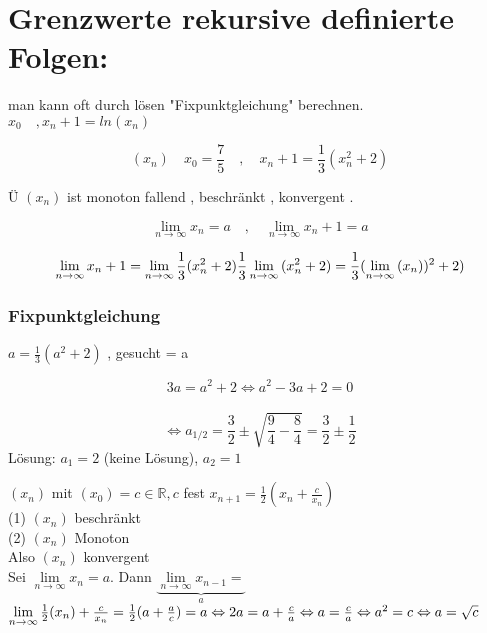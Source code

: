 \newpage

\section{Grenzwerte rekursive definierte Folgen:}

man kann oft durch lösen "Fixpunktgleichung" berechnen.\\
$x_0 \quad , x_n+1 = ln(x_n)$

\begin{example}
\[(x_n) \quad x_0 = \frac{7}{5} \quad,\quad x_n+1= \frac{1}{3}(x_n^2+2)  \]

Ü $(x_n)$ ist monoton fallend , beschränkt , konvergent . 

\[\lim\limits_{n \rightarrow \infty}{x_n}=a \quad,\quad 
\lim\limits_{n \rightarrow \infty}{x_n+1}=a \]

\begin{equation*}
\begin{aligned}
\lim\limits_{n \rightarrow \infty}{x_n+1} 
= \linebreak  
\lim\limits_{n \rightarrow \infty}{\frac{1}{3}(x_n^2 + 2)
\frac{1}{3}} \lim\limits_{n \rightarrow \infty}{(x_n^2 + 2)}
=
\frac{1}{3} (\lim\limits_{n \rightarrow \infty}{(x_n))^2 + 2)}
\end{aligned}
\end{equation*}
\end{example}

\subsubsection{Fixpunktgleichung }
 $a = \frac{1}{3}(a^2 + 2) $  , gesucht = a
 
\[ 3a = a^2 +2 \Leftrightarrow a^2 -3a+2 = 0 \] \\
\[ \Leftrightarrow a_{1/2} = \frac{3}{2} \pm \sqrt{\frac{9}{4}-\frac{8}{4}}= \frac{3}{2} \pm \frac{1}{2}\]
Lösung:  $a_1 = 2$ (keine Lösung),  $a_2 =1 $

\begin{example}{$(x_n)$ mit $(x_0) = c \in \mathbb{R} , c  $ fest $x_{n+1}= \frac{1}{2}(x_n+\frac{c}{x_n})$ }\\
(1) $(x_n)$ beschränkt \checkmark\\
(2) $(x_n)$ Monoton \checkmark\\
Also $(x_n)$ konvergent \\
Sei $\lim\limits_{n \rightarrow \infty}{x_n}= a $. 
Dann $\underbrace{\lim\limits_{n \rightarrow \infty}{x_{n-1}}= }_{a}$ $\lim\limits_{n \rightarrow \infty}{\frac{1}{2}}(x_n) + \frac{c}{x_n} = \frac{1}{2}(a + \frac{a}{c})= a \\
 \Leftrightarrow 2a = a + \frac{c}{a} \Leftrightarrow a = \frac{c}{a } \Leftrightarrow a^2 = c \Leftrightarrow a = \sqrt{c}$
\end{example}

